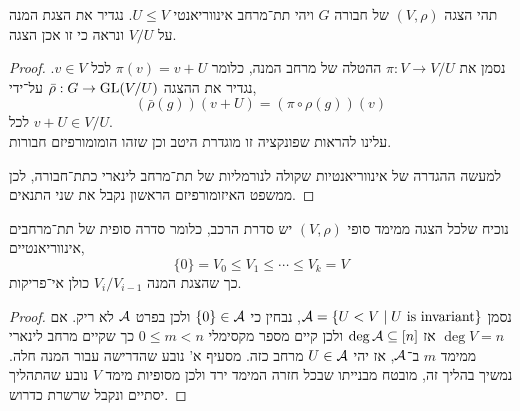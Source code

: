 \question{}
\subquestion{}
תהי הצגה $(V, \rho)$ של חבורה $G$ ויהי תת־מרחב אינווריאנטי $U \le V$.
נגדיר את הצגת המנה על $V / U$ ונראה כי זו אכן הצגה.
\begin{proof}
	נסמן את $\pi : V \to V / U$ ההטלה של מרחב המנה, כלומר $\pi(v) = v + U$ לכל $v \in V$.
	נגדיר את ההצגה $\bar{\rho} : G \to \operatorname{GL}(V / U)$ על־ידי,
	\[
		(\bar{\rho}(g))(v + U)
		= (\pi \circ \rho(g))(v)
	\]
	לכל $v + U \in V / U$. \\
	עלינו להראות שפונקציה זו מוגדרת היטב וכן שזהו הומומורפיזם חבורות.

	למעשה ההגדרה של אינווריאנטיות שקולה לנורמליות של תת־מרחב לינארי כתת־חבורה, לכן ממשפט האיזומורפיזם הראשון נקבל את שני התנאים.
\end{proof}

\subquestion{}
נוכיח שלכל הצגה ממימד סופי $(V, \rho)$ יש סדרת הרכב,
כלומר סדרה סופית של תת־מרחבים אינווריאנטיים,
\[
	\{ 0 \} = V_0 \le V_1 \le \cdots \le V_k = V
\]
כך שהצגת המנה $V_i / V_{i - 1}$ כולן אי־פריקות.
\begin{proof}
	נסמן $\mathcal{A} = \{ U < V \mid U \text{ is invariant} \}$, נבחין כי $\{ 0 \} \in \mathcal{A}$ ולכן בפרט $\mathcal{A}$ לא ריק.
	אם $\deg V = n$ אז $\deg \mathcal{A} \subseteq [n]$ ולכן קיים מספר מקסימלי $0 \le m < n$ כך שקיים מרחב לינארי ממימד $m$ ב־$\mathcal{A}$, אז יהי $U \in \mathcal{A}$ מרחב כזה.
	מסעיף א' נובע שהדרישה עבור המנה חלה.
	נמשיך בהליך זה, מובטח מבנייתו שבכל חזרה המימד ירד ולכן מסופיות מימד $V$ נובע שהתהליך יסתיים ונקבל שרשרת כדרוש.
\end{proof}


